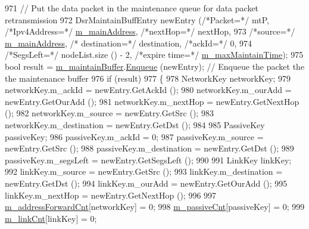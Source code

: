 \begin{DoxyCode}
971               \textcolor{comment}{// Put the data packet in the maintenance queue for data packet retransmission}
972               DsrMaintainBuffEntry newEntry (\textcolor{comment}{/*Packet=*/} mtP, \textcolor{comment}{/*Ipv4Address=*/} 
      \hyperlink{classns3_1_1dsr_1_1DsrRouting_a73182b5edee2d8460f28855e058fc9a0}{m\_mainAddress}, \textcolor{comment}{/*nextHop=*/} nextHop,
973                                                       \textcolor{comment}{/*source=*/} \hyperlink{classns3_1_1dsr_1_1DsrRouting_a73182b5edee2d8460f28855e058fc9a0}{m\_mainAddress}, \textcolor{comment}{/*
      destination=*/} destination, \textcolor{comment}{/*ackId=*/} 0,
974                                                       \textcolor{comment}{/*SegsLeft=*/} nodeList.size () - 2, \textcolor{comment}{/*expire time=*/} 
      \hyperlink{classns3_1_1dsr_1_1DsrRouting_ac6b1dffa9665af0d6a71aa7b947962ee}{m\_maxMaintainTime});
975               \textcolor{keywordtype}{bool} result = \hyperlink{classns3_1_1dsr_1_1DsrRouting_ac9d28a64437fbe20a4228c9811f9fc27}{m\_maintainBuffer}.\hyperlink{classns3_1_1dsr_1_1DsrMaintainBuffer_a8ec30b5b9b0f6af36e61867327a47717}{Enqueue} (newEntry); \textcolor{comment}{// Enqueue the
       packet the the maintenance buffer}
976               \textcolor{keywordflow}{if} (result)
977                 \{
978                   NetworkKey networkKey;
979                   networkKey.m\_ackId = newEntry.GetAckId ();
980                   networkKey.m\_ourAdd = newEntry.GetOurAdd ();
981                   networkKey.m\_nextHop = newEntry.GetNextHop ();
982                   networkKey.m\_source = newEntry.GetSrc ();
983                   networkKey.m\_destination = newEntry.GetDst ();
984 
985                   PassiveKey passiveKey;
986                   passiveKey.m\_ackId = 0;
987                   passiveKey.m\_source = newEntry.GetSrc ();
988                   passiveKey.m\_destination = newEntry.GetDst ();
989                   passiveKey.m\_segsLeft = newEntry.GetSegsLeft ();
990 
991                   LinkKey linkKey;
992                   linkKey.m\_source = newEntry.GetSrc ();
993                   linkKey.m\_destination = newEntry.GetDst ();
994                   linkKey.m\_ourAdd = newEntry.GetOurAdd ();
995                   linkKey.m\_nextHop = newEntry.GetNextHop ();
996 
997                   \hyperlink{classns3_1_1dsr_1_1DsrRouting_a5042f7e5df0470025fdb6023fcc24411}{m\_addressForwardCnt}[networkKey] = 0;
998                   \hyperlink{classns3_1_1dsr_1_1DsrRouting_a7fec404d680459aab2b40941a950502d}{m\_passiveCnt}[passiveKey] = 0;
999                   \hyperlink{classns3_1_1dsr_1_1DsrRouting_a85ba159639f9bc13b3d8890458128a79}{m\_linkCnt}[linkKey] = 0;

\end{DoxyCode}
